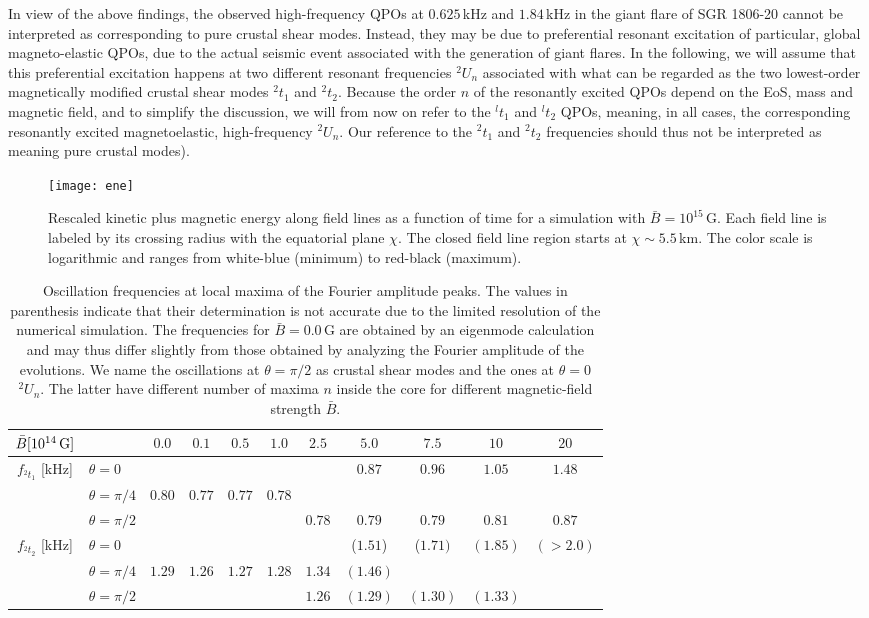 \documentclass[useAMS,usenatbib]{mnras}
\begin{document}
In view of the above findings, the observed high-frequency QPOs at 
$0.625$\,kHz and $1.84\,$kHz in the giant flare of SGR 1806-20 cannot 
be interpreted as corresponding to pure crustal shear modes.
Instead, they may be due to preferential resonant excitation of particular, 
global magneto-elastic QPOs, due to the actual seismic event associated with the 
generation of giant flares. In the following, we will assume that this 
preferential excitation happens at two different resonant frequencies ${}^2 U_n$ 
associated with what can be regarded as the two lowest-order magnetically 
modified crustal shear modes  $^2t_1$ and $^2t_2$. Because the order $n$ of the 
resonantly excited QPOs depend on the EoS, mass and magnetic 
field, and to simplify the discussion, we will from now on refer to the 
${}^lt_1$ and 
$^lt_2$ QPOs, meaning, in all cases, the corresponding resonantly excited 
magnetoelastic, high-frequency  ${}^2
U_n$. Our reference to the  $^2t_1$ and $^2t_2$ frequencies should thus not be 
interpreted as meaning pure crustal modes). 

%
\begin{figure}
\texttt{[image: ene]}
\caption{Rescaled kinetic plus magnetic energy along field lines as a function 
of time for a simulation with $\bar B=10^{15}\,$G. Each field line is labeled 
by its crossing radius with the equatorial 
plane $\chi$. The closed field line region starts at $\chi\sim5.5\,$km. The 
color scale is logarithmic and ranges from white-blue (minimum) to 
red-black (maximum).}
\label{fig_n1_ener}
\end{figure}
%

%
\begin{table*}
\begin{tabular}{c | l c c c c c c c c c}
 $\bar B[10^{14}\,{\rm G}]$
&&$0.0$&$0.1$&$0.5$&$1.0$&$2.5$&$5.0$&$7.5$&$10$&$20$\\\hline
 $f_{^2t_1}$ [kHz]&$\theta=0$&&&&&&$0.87$&$0.96$&$1.05$&$1.48$\\
 &$\theta=\pi/4$&$0.80$&$0.77$&$0.77$&$0.78$\\
 &$\theta=\pi/2$&&&&&$0.78$&$0.79$&$0.79$&$0.81$&$0.87$\\\hline
 $f_{^2t_2}$ [kHz] &$\theta=0$&&&&&&($1.51$)&($1.71)$&$(1.85)$&$(>2.0)$\\
 &$\theta=\pi/4$&$1.29$&$1.26$&$1.27$&$1.28$&$1.34$&$(1.46)$&\\
 &$\theta=\pi/2$&&&&&$1.26$&$(1.29)$&$(1.30)$&$(1.33)$\\\hline
\end{tabular}
\caption{Oscillation frequencies at local maxima of the Fourier amplitude peaks. 
The values in parenthesis indicate that their determination is not accurate due 
to the limited resolution of the numerical simulation. The frequencies for $\bar 
B=0.0\,$G are obtained by an eigenmode calculation and may thus differ slightly 
from those obtained by analyzing the Fourier amplitude of the evolutions. We 
name the oscillations at $\theta=\pi/2$ as crustal shear modes and the ones at 
$\theta=0$ $^2U_n$. The latter have different number of maxima $n$ inside the 
core for different magnetic-field strength $\bar B$.}
\label{tab_n1}
\end{table*}
\end{document}
